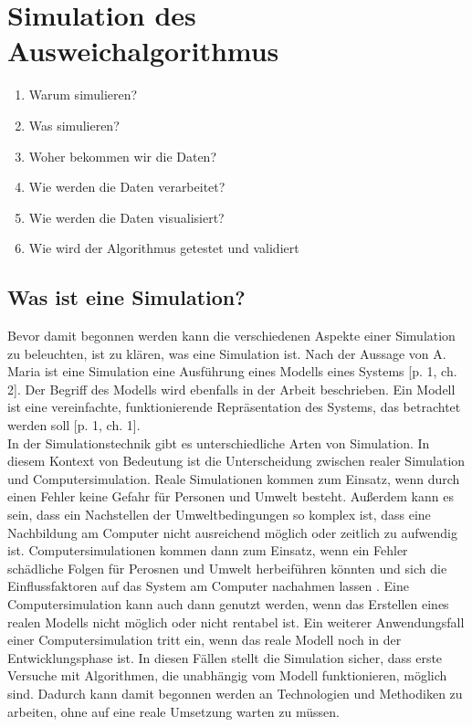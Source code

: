\section{Simulation des Ausweichalgorithmus}

\begin{enumerate}
    \item Warum simulieren?
    \item Was simulieren?
    \item Woher bekommen wir die Daten?
    \item Wie werden die Daten verarbeitet?
    \item Wie werden die Daten visualisiert?
    \item Wie wird der Algorithmus getestet und validiert
\end{enumerate}

 \subsection{Was ist eine Simulation?}
 Bevor damit begonnen werden kann die verschiedenen Aspekte einer Simulation zu beleuchten, ist zu klären, was eine Simulation ist.
 Nach der Aussage von A. Maria ist eine Simulation eine Ausführung eines Modells eines Systems \cite{maria1997introduction}[p. 1, ch. 2].
Der Begriff des Modells wird ebenfalls in der Arbeit beschrieben. Ein Modell ist eine vereinfachte, funktionierende Repräsentation des Systems, das betrachtet werden soll \cite{maria1997introduction}[p. 1, ch. 1].\\
In der Simulationstechnik gibt es unterschiedliche Arten von Simulation. In diesem Kontext von Bedeutung ist die Unterscheidung zwischen realer Simulation und Computersimulation. Reale Simulationen kommen zum Einsatz, wenn durch einen Fehler keine Gefahr für Personen und Umwelt besteht.
Außerdem kann es sein, dass ein Nachstellen der Umweltbedingungen so komplex ist, dass eine Nachbildung am Computer nicht ausreichend möglich oder zeitlich zu aufwendig ist. Computersimulationen kommen dann zum Einsatz, wenn ein Fehler schädliche Folgen für Perosnen und Umwelt
herbeiführen könnten und sich die Einflussfaktoren auf das System am Computer nachahmen lassen \cite{Britannica2023}. 
Eine Computersimulation kann auch dann genutzt werden, wenn das Erstellen eines realen Modells nicht möglich oder nicht rentabel ist. Ein weiterer Anwendungsfall einer Computersimulation tritt ein, wenn das reale Modell noch in der Entwicklungsphase ist. 
In diesen Fällen stellt die Simulation sicher, dass erste Versuche mit Algorithmen, die unabhängig vom Modell funktionieren, möglich sind. 
Dadurch kann damit begonnen werden an Technologien und Methodiken zu arbeiten, ohne auf eine reale Umsetzung warten zu müssen.
